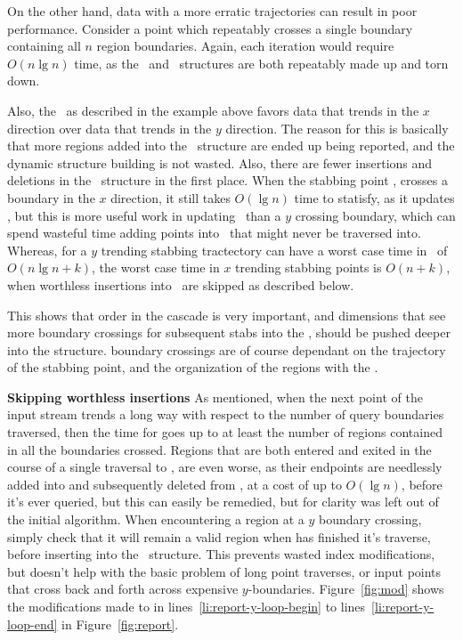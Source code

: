 \documentclass{sig-alternate}
\newcommand{\ct}{\id{DCT}}
\newcommand{\inC}[1]{{\id{DCT_{#1}}}}
\newcommand{\X}{{\inC{X}}}
\newcommand{\A}{{\inC{A}}}
\begin{document}
On the other hand, data with a more erratic trajectories can result in
poor performance.  Consider a point which repeatably crosses a single
boundary containing all $n$ region boundaries.  Again, each iteration
would require $O(n\lg{n})$ time, as the \X\ and \A\ structures are
both repeatably made up and torn down.

Also, the \ct\ as described in the example above favors data that
trends in the $x$ direction over data that trends in the $y$
direction.  The reason for this is basically that more regions added
into the \X\ structure are ended up being reported, and the dynamic
structure building is not wasted.  Also, there are fewer insertions
and deletions in the \X\ structure in the first place.  When the
stabbing point , crosses a boundary in the $x$ direction, it
still takes $O(\lg{n})$ time to statisfy, as it updates \A, but this
is more useful work in updating \A\ than a $y$ crossing boundary,
which can spend wasteful time adding points into \X\ that might never
be traversed into.  Whereas, for a $y$ trending stabbing tractectory
can have a worst case time in \ of
$O(n\lg{n}+k)$, the worst case time in $x$ trending stabbing points is
$O(n+k)$, when worthless insertions into \A\ are skipped as described
below.

This shows that order in the cascade is very important, and dimensions
that see more boundary crossings for subsequent stabs into the \ct,
should be pushed deeper into the structure.  boundary crossings are of
course dependant on the trajectory of the stabbing point, and the
organization of the regions with the \ct.

{\bf Skipping worthless insertions}
%
As mentioned, when the next point of the input stream trends a long
way with respect to the number of query boundaries traversed, then the
time for  goes up to at least the number of
regions contained in all the boundaries crossed.  Regions that are
both entered and exited in the course of a single traversal to
, are even worse, as their endpoints are needlessly added into
and subsequently deleted from \X, at a cost of up to $O(\lg{n})$,
before it's ever queried, but this can easily be remedied, but for
clarity was left out of the initial  algorithm.
When encountering a region at a $y$ boundary crossing, simply check
that it will remain a valid region when  has finished it's
traverse, before inserting into the \X\ structure.  This prevents
wasted index modifications, but doesn't help with the basic problem of
long point traverses, or input points that cross back and forth across
expensive $y$-boundaries.  Figure~\ref{fig:mod} shows the
modifications made to  in
lines~\ref{li:report-y-loop-begin} to
lines~\ref{li:report-y-loop-end} in Figure~\ref{fig:report}.
\end{document}
